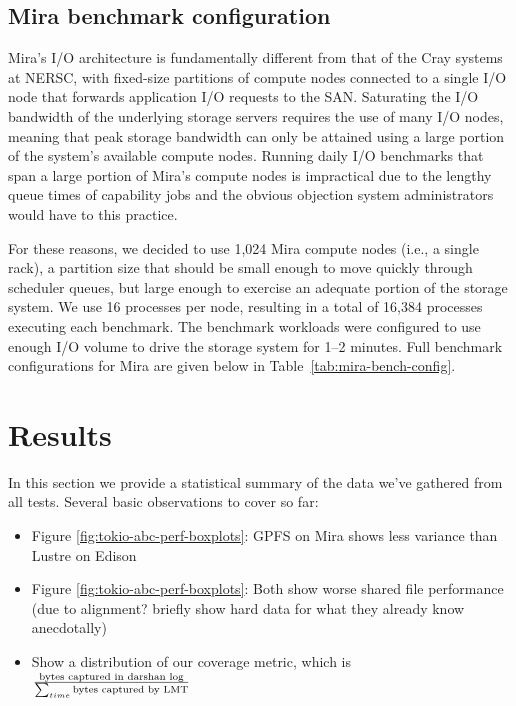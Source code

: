\documentclass[conference,10pt,compsocconf]{IEEEtran}
\begin{document}
\subsection{Mira benchmark configuration}

Mira's I/O architecture is fundamentally different from that of the Cray
systems at NERSC, with fixed-size partitions of compute nodes connected to
a single I/O node that forwards application I/O requests to the SAN.
Saturating the I/O bandwidth of the underlying storage servers requires the
use of many I/O nodes, meaning that peak storage bandwidth can only be
attained using a large portion of the system's available compute nodes.
Running daily I/O benchmarks that span a large portion of Mira's compute
nodes is impractical due to the lengthy queue times of capability jobs and
the obvious objection system administrators would have to this practice.

For these reasons, we decided to use 1,024 Mira compute nodes (i.e., a single
rack), a partition size that should be small enough to move quickly through
scheduler queues, but large enough to exercise an adequate portion of the
storage system. We use 16 processes per node, resulting in a total of 16,384
processes executing each benchmark. The benchmark workloads were configured
to use enough I/O volume to drive the storage system for 1--2 minutes.
Full benchmark configurations for Mira are given below in
Table~\ref{tab:mira-bench-config}.

\section{Results} \label{results}

In this section we provide a statistical summary of the data we've gathered
from all tests.  Several basic observations to cover so far:

\begin{itemize}
\item Figure \ref{fig:tokio-abc-perf-boxplots}: GPFS on Mira shows less variance than Lustre on Edison
\item Figure \ref{fig:tokio-abc-perf-boxplots}: Both show worse shared file performance (due to alignment? briefly show hard data for what they already know anecdotally)
\item Show a distribution of our coverage metric, which is \( {\textup{bytes captured in darshan log}} \over {\sum_{time}^{ }{\textup{bytes captured by LMT}}} \)
\end{itemize}
\end{document}

